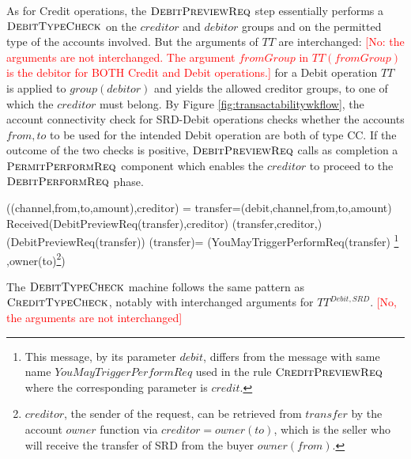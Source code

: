 As for Credit operations, the $\hbox{\sc DebitPreviewReq}$ step essentially performs a $\hbox{\sc DebitTypeCheck}$ on the $creditor$ and $debitor$ groups and on the permitted type of the accounts involved. But the arguments of $TT$ are interchanged: 
\textcolor{red}{[No: the arguments are not interchanged. The argument $fromGroup$ in $TT(fromGroup)$ is the debitor for BOTH Credit and Debit operations.]} 
for a Debit operation $TT$ is applied to  $group(debitor)$ and yields the allowed creditor groups, to one of which the $creditor$ must belong. By Figure \ref{fig:transactabilitywkflow}, the account connectivity check for SRD-Debit operations checks whether the accounts $from,to$ to be used for the intended Debit operation are both of type CC. If the outcome of the two checks is positive, $\hbox{\sc DebitPreviewReq}$ calls as completion a $\hbox{\sc PermitPerformReq}$ component which enables the $creditor$ to proceed to the $\hbox{\sc DebitPerformReq}$ phase. 


\begin{asm}
((channel,from,to,amount),creditor)  =\+
  \LET transfer=(debit,channel,from,to,amount)\\
  \IF Received(DebitPreviewReq(transfer),\FROM creditor) \THEN \+   
          (transfer,creditor,)\\
      (DebitPreviewReq(transfer)) \dec\-
\WHERE \+
(transfer)=\+
(YouMayTriggerPerformReq(transfer)
\footnote{This message,  by its parameter $debit$, differs 
	from the message with same name $YouMayTriggerPerformReq$ used in the rule $\hbox{\sc CreditPreviewReq}$ where the corresponding parameter is $credit$.}
,\TO  owner(to)\footnote{$creditor$, the sender of the 
	request, can be retrieved from $transfer$ by the account $owner$ function via $creditor=owner(to)$, which is the seller who will receive the transfer of SRD from the buyer $owner(from)$.}) 
\end{asm}

The $\hbox{\sc DebitTypeCheck}$ machine follows the same pattern as $\hbox{\sc CreditTypeCheck}$, 
notably with interchanged arguments for $TT^{Debit,SRD}$.
\textcolor{red}{[No, the arguments are not interchanged]}


